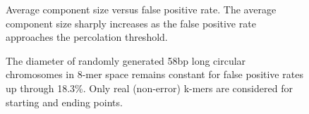 \documentclass{pnastwo}
\begin{document}
\begin{figure}
\caption{Average component size versus false positive rate. The average 
component size sharply increases as the false positive 
rate approaches the percolation threshold.
}
\label{fig:clustersize}
\end{figure}

\begin{figure}

\caption{The diameter of randomly generated 58bp long circular
  chromosomes in 8-mer space remains constant for false
  positive rates up through 18.3\%. Only real (non-error) k-mers are considered for
  starting and ending points.}
\label{fig:diam}
\end{figure}
\end{document}
